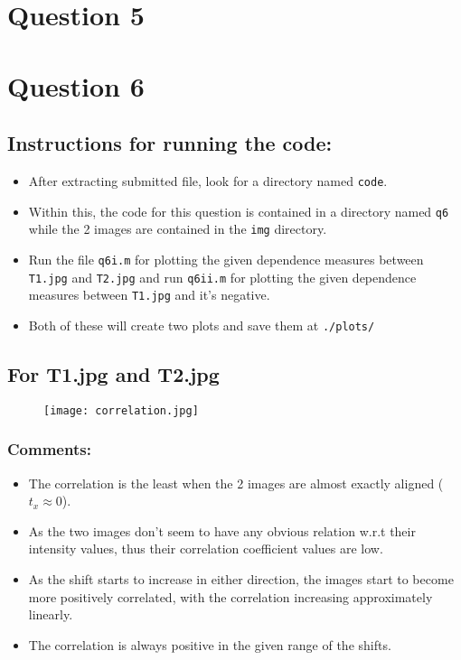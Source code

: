 \documentclass[11pt, fleqn]{article}
\begin{document}
\newpage
\section*{Question 5}
\setcounter{equation}{0}





\newpage
\section*{Question 6}
\setcounter{equation}{0}

\subsection*{Instructions for running the code:}
\begin{itemize}
    \item After extracting submitted file, look for a directory named \texttt{code}. 
    \item Within this, the code for this question is contained in a directory named \texttt{q6} while the 2 images are contained in the \texttt{img} directory.
    \item Run the file \texttt{q6i.m} for plotting the given dependence measures between \texttt{T1.jpg} and \texttt{T2.jpg} and run \texttt{q6ii.m} for plotting the given dependence measures between \texttt{T1.jpg} and it's negative. 
    \item Both of these will create two plots and save them at \texttt{./plots/}
\end{itemize}
\vspace{-1em}
\subsection*{\Large For T1.jpg and T2.jpg}

\begin{figure}[H]
    \centering
    \texttt{[image: correlation.jpg]}
    \label{q6ic}
\end{figure}

\subsubsection*{Comments:}
\begin{itemize}
    \item The correlation is the least when the 2 images are almost exactly aligned ($t_x \approx 0$).
    \item As the two images don't seem to have any obvious relation w.r.t their intensity values, thus their correlation coefficient values are low.
    \item As the shift starts to increase in either direction, the images start to become more positively correlated, with the correlation increasing approximately linearly.
    \item The correlation is always positive in the given range of the shifts.
\end{itemize}
\end{document}
